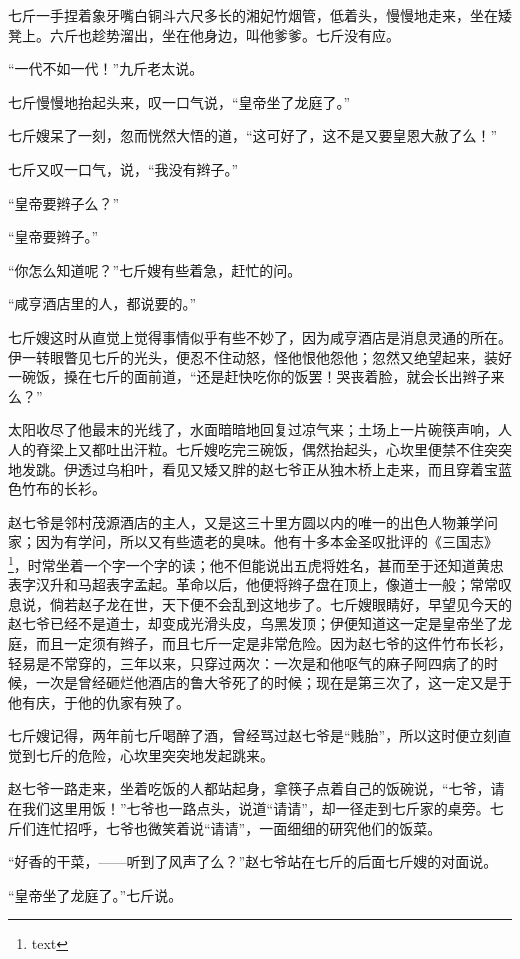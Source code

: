 \documentclass[12pt,UTF8]{ctexbook}
\begin{document}
七斤一手捏着象牙嘴白铜斗六尺多长的湘妃竹烟管，低着头，慢慢地走来，坐在矮凳上。六斤也趁势溜出，坐在他身边，叫他爹爹。七斤没有应。

“一代不如一代！”九斤老太说。

七斤慢慢地抬起头来，叹一口气说，“皇帝坐了龙庭了。”

七斤嫂呆了一刻，忽而恍然大悟的道，“这可好了，这不是又要皇恩大赦了么！”

七斤又叹一口气，说，“我没有辫子。”

“皇帝要辫子么？”

“皇帝要辫子。”

“你怎么知道呢？”七斤嫂有些着急，赶忙的问。

“咸亨酒店里的人，都说要的。”

七斤嫂这时从直觉上觉得事情似乎有些不妙了，因为咸亨酒店是消息灵通的所在。伊一转眼瞥见七斤的光头，便忍不住动怒，怪他恨他怨他；忽然又绝望起来，装好一碗饭，搡在七斤的面前道，“还是赶快吃你的饭罢！哭丧着脸，就会长出辫子来么？”

太阳收尽了他最末的光线了，水面暗暗地回复过凉气来；土场上一片碗筷声响，人人的脊梁上又都吐出汗粒。七斤嫂吃完三碗饭，偶然抬起头，心坎里便禁不住突突地发跳。伊透过乌桕叶，看见又矮又胖的赵七爷正从独木桥上走来，而且穿着宝蓝色竹布的长衫。

赵七爷是邻村茂源酒店的主人，又是这三十里方圆以内的唯一的出色人物兼学问家；因为有学问，所以又有些遗老的臭味。他有十多本金圣叹批评的《三国志》\footnote{text}，时常坐着一个字一个字的读；他不但能说出五虎将姓名，甚而至于还知道黄忠表字汉升和马超表字孟起。革命以后，他便将辫子盘在顶上，像道士一般；常常叹息说，倘若赵子龙在世，天下便不会乱到这地步了。七斤嫂眼睛好，早望见今天的赵七爷已经不是道士，却变成光滑头皮，乌黑发顶；伊便知道这一定是皇帝坐了龙庭，而且一定须有辫子，而且七斤一定是非常危险。因为赵七爷的这件竹布长衫，轻易是不常穿的，三年以来，只穿过两次：一次是和他呕气的麻子阿四病了的时候，一次是曾经砸烂他酒店的鲁大爷死了的时候；现在是第三次了，这一定又是于他有庆，于他的仇家有殃了。

七斤嫂记得，两年前七斤喝醉了酒，曾经骂过赵七爷是“贱胎”，所以这时便立刻直觉到七斤的危险，心坎里突突地发起跳来。

赵七爷一路走来，坐着吃饭的人都站起身，拿筷子点着自己的饭碗说，“七爷，请在我们这里用饭！”七爷也一路点头，说道“请请”，却一径走到七斤家的桌旁。七斤们连忙招呼，七爷也微笑着说“请请”，一面细细的研究他们的饭菜。

“好香的干菜，——听到了风声了么？”赵七爷站在七斤的后面七斤嫂的对面说。

“皇帝坐了龙庭了。”七斤说。
\end{document}
